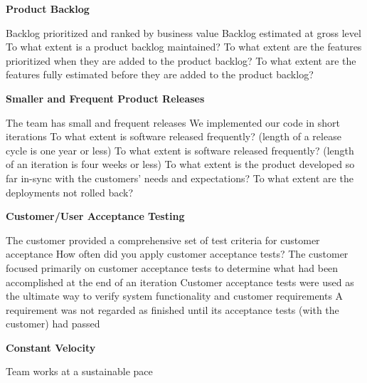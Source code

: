 \textbf{Product Backlog}
\begin{itemize}
	\taa Backlog prioritized and ranked by business value
	\taar Backlog estimated at gross level %
	\ops To what extent is a product backlog maintained?
	\ops To what extent are the features prioritized when they are added to the product backlog?
	\ops To what extent are the features fully estimated before they are added to the product backlog?
\end{itemize}

\textbf{Smaller and Frequent Product Releases}
\begin{itemize}
	\taa The team has small and frequent releases
	\pam We implemented our code in short iterations
	\ops To what extent is software released frequently? (length of a release cycle is one year or less)
	\ops To what extent is software released frequently? (length of an iteration is four weeks or less)
	\ops To what extent is the product developed so far in-sync with the customers' needs and expectations? 
	\ops To what extent are the deployments not rolled back? 
\end{itemize}

\textbf{Customer/User Acceptance Testing}
\begin{itemize}
	\pam The customer provided a comprehensive set of test criteria for customer acceptance %
	\pamr How often did you apply customer acceptance tests?
	\pamr The customer focused primarily on customer acceptance tests to determine what had been accomplished at the end of an iteration
	\pamr Customer acceptance tests were used as the ultimate way to verify system functionality and customer requirements
	\pamr A requirement was not regarded as finished until its acceptance tests (with the customer) had passed
\end{itemize}

\textbf{Constant Velocity}
\begin{itemize}
	\taar Team works at a sustainable pace
\end{itemize}

